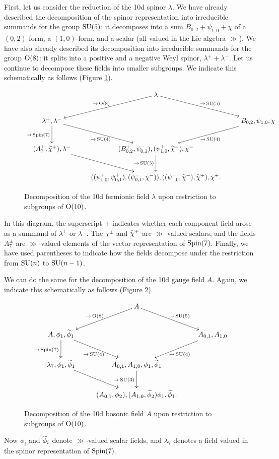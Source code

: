 \documentclass[10pt, oneside]{article}
\begin{document}
First, let us consider the reduction of the 10d spinor $\lambda$.  We have already described the decomposition of the spinor representation into irreducible summands for the group $\mathrm{SU}(5)$: it decomposes into a sum $B_{0,2} + \psi_{1,0} + \chi$ of a $(0,2)$-form, a $(1,0)$-form, and a scalar (all valued in the Lie algebra $\gg$).  We have also already described its decomposition into irreducible summands for the group $\mathrm{O}(8)$: it splits into a positive and a negative Weyl spinor, $\lambda^+ + \lambda^-$.  Let us continue to decompose these fields into smaller subgroups.  We indicate this schematically as follows (Figure \ref{fig:8dfermiondecomp}).
\begin{figure}[!htb]
\[
\xymatrix{
&\lambda \ar[dl]_{\to\,  \mr{O}(8)} \ar[dr]^{\to\,  \SU(5)} &\\
\lambda^+, \lambda^- \ar[dr]_{\to\,  \SU(4)} \ar[d]_{\to\,  \Spin(7)} &&B_{0,2}, \psi_{1,0}, \chi \ar[dl]^{\to\,  \SU(4)} \\
(A_7^+, \wt \chi^+), \lambda^- \ar[dr] &(B_{0,2}^+, \psi_{0,1}^-), (\psi_{1,0}^+, \wt \chi^-), \chi^- \ar[d]_{\to\,  \SU(3)} &\\
 &((\psi_{1,0}^+, \psi_{0,1}^+), (\psi_{0,1}^-, \chi^-)), ((\psi_{1,0}^-, \wt \chi^-), \wt \chi^+), \chi^+. &
}\]
\caption{Decomposition of the 10d fermionic field $\lambda$ upon restriction to subgroups of $\mathrm{O}(10)$.}
\label{fig:8dfermiondecomp}
\end{figure}
In this diagram, the superscript $\pm$ indicates whether each component field arose as a summand of $\lambda^+$ or $\lambda^-$.  The $\chi^\pm$ and $\widetilde{\chi}^\pm$ are $\gg$-valued scalars, and the fields $A_7^\pm$ are $\gg$-valued elements of the vector representation of $\mathrm{Spin}(7)$.  Finally, we have used parentheses to indicate how the fields decompose under the restriction from $\mathrm{SU}(n)$ to $\mathrm{SU}(n-1)$.

We can do the same for the decomposition of the 10d gauge field $A$.  Again, we indicate this schematically as follows (Figure \ref{fig:8dbosondecomp}).
\begin{figure}[!h]
\[\xymatrix{
&A \ar[dl]_{\to\,  \mr{O}(8)} \ar[dr]^{\to\,  \SU(5)} & \\
A,\phi_1, \wt \phi_1 \ar[dr]_{\to\,  \SU(4)} \ar[d]_{\to\,  \Spin(7)} &&A_{0,1}, A_{1,0} \ar[dl]^{\to\,  \SU(4)} \\
\lambda_7, \phi_1, \wt \phi_1 \ar[dr] &A_{0,1},A_{1,0},\phi_1, \wt \phi_1 \ar[d]_{\to\,  \SU(3)} & \\
&(A_{0,1}, \phi_2) ,(A_{1,0}, \wt \phi_2) \phi_1, \wt \phi_1.&
}
\]
\caption{Decomposition of the 10d bosonic field $A$ upon restriction to subgroups of $\mathrm{O}(10)$.}
\label{fig:8dbosondecomp}
\end{figure}
Now $\phi_i$ and $\widetilde{\phi}_i$ denote $\gg$-valued scalar fields, and $\lambda_7$ denotes a field valued in the spinor representation of $\mathrm{Spin}(7)$.
\end{document}
